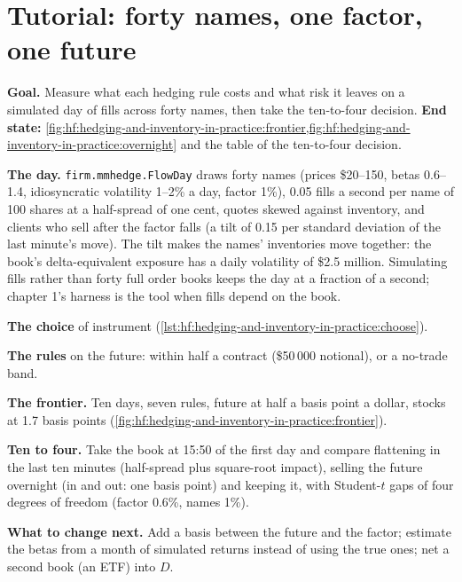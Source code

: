 \section{Tutorial: forty names, one factor, one future}\label{tut:hf:hedging-and-inventory-in-practice:tut}

\begin{tutorial}
\textbf{Goal.} Measure what each hedging rule costs and what risk it leaves on a simulated day of fills across forty names, then take the ten-to-four
decision. \textbf{End state:} \cref{fig:hf:hedging-and-inventory-in-practice:frontier,fig:hf:hedging-and-inventory-in-practice:overnight} and the table
of the ten-to-four decision.
\begin{tutsteps}
\item \textbf{The day.} \texttt{firm.mmhedge.FlowDay} draws forty names (prices \$20--150, betas 0.6--1.4, idiosyncratic volatility 1--2\% a day,
factor 1\%), 0.05 fills a second per name of 100 shares at a half-spread of one cent, quotes skewed against inventory, and clients who sell after the
factor falls (a tilt of 0.15 per standard deviation of the last minute's move). The tilt makes the names' inventories move together: the book's
delta-equivalent exposure has a daily volatility of \$2.5 million. Simulating fills rather than forty full order books keeps the day at a fraction of
a second; chapter 1's harness is the tool when fills depend on the book.
\item \textbf{The choice} of instrument (\cref{lst:hf:hedging-and-inventory-in-practice:choose}).
\label{lst:hf:hedging-and-inventory-in-practice:choose}
\item \textbf{The rules} on the future: within half a contract (\$50\,000 notional), or a no-trade band.
\label{lst:hf:hedging-and-inventory-in-practice:band}
\item \textbf{The frontier.} Ten days, seven rules, future at half a basis point a dollar, stocks at 1.7 basis points (\cref{fig:hf:hedging-and-inventory-in-practice:frontier}).
\item \textbf{Ten to four.} Take the book at 15:50 of the first day and compare flattening in the last ten minutes (half-spread plus square-root
impact), selling the future overnight (in and out: one basis point) and keeping it, with Student-$t$ gaps of four degrees of freedom (factor 0.6\%,
names 1\%).
\end{tutsteps}
\textbf{What to change next.} Add a basis between the future and the factor; estimate the betas from a month of simulated returns instead of using
the true ones; net a second book (an ETF) into $D$.
\end{tutorial}

